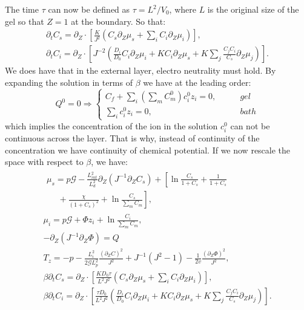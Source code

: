 The time $\tau$ can now be defined as $\tau=L^2/V_0$, where $L$ is the original size of the gel so that $Z=1$ at the boundary. So that:
\begin{gather}
\partial_t C_s=\partial_Z \cdot\left[\frac{K}{J^2} \left(C_s\partial_Z \mu_s +\sum_i  C_i \partial_Z \mu_i\right)\right],\\
\partial_t C_i= \partial_Z \cdot\left[ J^{-2} \left(\frac{D_i}{D_0}C_i\partial_Z \mu_i + K C_i \partial_Z\mu_s + K \sum_j \frac{C_jC_i}{C_s}\partial_Z\mu_j\right)\right].
\end{gather}
We does have that in the external layer, electro neutrality must hold. By expanding the solution in terms of $\beta$ we have at the leading order:
\begin{equation}
Q^0=0 \Longrightarrow \begin{cases}
C_f+\sum_i \left(\sum_m C^0_m\right)c^0_i z_i=0,&\qquad gel\\
\sum_i c^0_i z_i = 0, &\qquad bath
\end{cases}
\end{equation}
which implies the concentration of the ion in the solution $c^0_i$ can not be continuous across the layer. That is why, instead of continuity of the concentration we have continuity of chemical potential.
If we now rescale the space with respect to $\beta$, we have:
\begin{gather}
\begin{aligned}
\mu_s = p \mathcal{G} - \frac{L^2_{int}}{L_d^2}  \partial_Z (J^{-1} \partial_Z C_s) + \left[\ln \frac{C_s}{1+C_s} + \frac{1}{1+C_s}\right.\\
\left.\ \ \ \ \ \ +\frac{\chi}{(1+C_s)^2} + \ln \frac{C_s}{\sum_m C_m} \right], 
\end{aligned}\\[2.5mm]
\mu_i = p \mathcal{G}+ \Phi z_i + \ln \frac{C_i}{\sum_m C_m} ,\\
- \partial_Z (J^{-1}\partial_Z\Phi) = Q\, \\[2.5mm]
T_z= -p - \frac{L^2_i}{2\mathcal{G}L_p^2} \frac{(\partial_Z C)^2}{J^2}+ J^{-1}\left(J^2-1\right)-\frac{1}{2v}\frac{(\partial_Z \Phi)^2}{J^2},\\
\beta\partial_t C_s=\partial_Z \cdot\left[\frac{K D_0\tau}{L^2J^2} \left(C_s\partial_Z \mu_s +\sum_i  C_i \partial_Z \mu_i\right)\right],\\
\beta\partial_t C_i= \partial_Z \cdot\left[ \frac{\tau D_0}{L^2J^2} \left(\frac{D_i}{D_0}C_i\partial_Z \mu_i + K C_i \partial_Z\mu_s + K \sum_j \frac{C_jC_i}{C_s}\partial_Z\mu_j\right)\right].
\end{gather}

